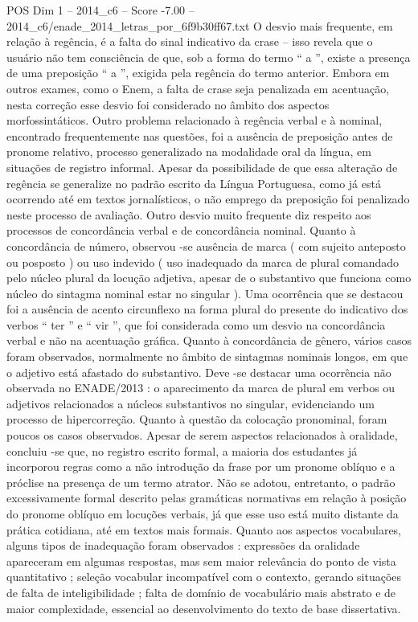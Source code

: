 \begin{textsample}{POS Dim 1 – 2014\_c6 – Score -7.00 – 2014\_c6/enade\_2014\_letras\_por\_6f9b30ff67.txt}
O desvio mais frequente, em relação à regência, é a falta do sinal indicativo da crase – isso revela que o usuário não tem consciência de que, sob a forma do termo “ a ”, existe a presença de uma preposição “ a ”, exigida pela regência do termo anterior.
Embora em outros exames, como o Enem, a falta de crase seja penalizada em acentuação, nesta correção esse desvio foi considerado no âmbito dos aspectos morfossintáticos.
Outro problema relacionado à regência verbal e à nominal, encontrado frequentemente nas questões, foi a ausência de preposição antes de pronome relativo, processo generalizado na modalidade oral da língua, em situações de registro informal.
Apesar da possibilidade de que essa alteração de regência se generalize no padrão escrito da Língua Portuguesa, como já está ocorrendo até em textos jornalísticos, o não emprego da preposição foi penalizado neste processo de avaliação.
Outro desvio muito frequente diz respeito aos processos de concordância verbal e de concordância nominal.
Quanto à concordância de número, observou -se ausência de marca ( com sujeito anteposto ou posposto ) ou uso indevido ( uso inadequado da marca de plural comandado pelo núcleo plural da locução adjetiva, apesar de o substantivo que funciona como núcleo do sintagma nominal estar no singular ).
Uma ocorrência que se destacou foi a ausência de acento circunflexo na forma plural do presente do indicativo dos verbos “ ter ” e “ vir ”, que foi considerada como um desvio na concordância verbal e não na acentuação gráfica.
Quanto à concordância de gênero, vários casos foram observados, normalmente no âmbito de sintagmas nominais longos, em que o adjetivo está afastado do substantivo.
Deve -se destacar uma ocorrência não observada no ENADE/2013 : o aparecimento da marca de plural em verbos ou adjetivos relacionados a núcleos substantivos no singular, evidenciando um processo de hipercorreção.
Quanto à questão da colocação pronominal, foram poucos os casos observados.
Apesar de serem aspectos relacionados à oralidade, concluiu -se que, no registro escrito formal, a maioria dos estudantes já incorporou regras como a não introdução da frase por um pronome oblíquo e a próclise na presença de um termo atrator.
Não se adotou, entretanto, o padrão excessivamente formal descrito pelas gramáticas normativas em relação à posição do pronome oblíquo em locuções verbais, já que esse uso está muito distante da prática cotidiana, até em textos mais formais.
Quanto aos aspectos vocabulares, alguns tipos de inadequação foram observados : expressões da oralidade apareceram em algumas respostas, mas sem maior relevância do ponto de vista quantitativo ; seleção vocabular incompatível com o contexto, gerando situações de falta de inteligibilidade ; falta de domínio de vocabulário mais abstrato e de maior complexidade, essencial ao desenvolvimento do texto de base dissertativa.

\end{textsample}
